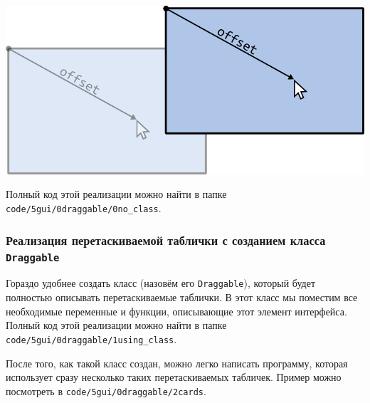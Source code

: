 \documentclass{article}
\begin{document}
\begin{center}
\includegraphics[scale=1]{../images/draggable.png}
\end{center}
Полный код этой реализации можно найти в папке \texttt{code/5gui/0draggable/0no\_class}.

\subsubsection*{Реализация перетаскиваемой таблички с созданием класса \texttt{Draggable}}
Гораздо удобнее создать класс (назовём его \texttt{Draggable}), который будет полностью описывать перетаскиваемые таблички. В этот класс мы поместим все необходимые переменные и функции, описывающие этот элемент интерфейса. Полный код этой реализации можно найти в папке \texttt{code/5gui/0draggable/1using\_class}.

После того, как такой класс создан, можно легко написать программу, которая использует сразу несколько таких перетаскиваемых табличек. Пример можно посмотреть в  \texttt{code/5gui/0draggable/2cards}.

\newpage
\end{document}
